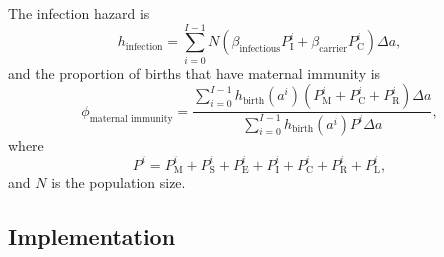 \documentclass{article}
\begin{document}
The infection hazard is
\begin{equation}
  \label{hazard_of_infection}
  h_{\text{infection}}
  = \sum_{i = 0}^{I - 1} N
  \left(
    \beta_{\text{infectious}} P_{\mathrm{I}}^i
    + \beta_{\text{carrier}} P_{\mathrm{C}}^i
  \right)
  \Delta a,
\end{equation}
and the proportion of births that have maternal immunity is
\begin{equation}
  \label{births_maternal_immunity}
  \phi_{\text{maternal immunity}}
  = \frac{
    \sum_{i = 0}^{I - 1}
    h_{\text{birth}}(a^i) \left(
      P_{\mathrm{M}}^i + P_{\mathrm{C}}^i + P_{\mathrm{R}}^i
    \right)
    \Delta a
  }{
    \sum_{i = 0}^{I - 1} h_{\text{birth}}(a^i) P^i \Delta a
  },
\end{equation}
where
\begin{equation}
  P^i =  P_{\mathrm{M}}^i + P_{\mathrm{S}}^i + P_{\mathrm{E}}^i
  + P_{\mathrm{I}}^i + P_{\mathrm{C}}^i + P_{\mathrm{R}}^i + P_{\mathrm{L}}^i,
\end{equation}
and $N$ is the population size.


\subsection{Implementation}
\end{document}
